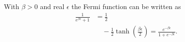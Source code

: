 \documentclass{article}
\begin{document}
With $\beta>0$ and real $\epsilon$ the Fermi function can be written as
\begin{align}
\frac{1}{e^{\beta\epsilon}+1} &= \frac{1}{2} \nonumber\\
&\quad - \frac{1}{2}\tanh\left(\frac{\beta\epsilon}{2}\right) = \frac{e^{-\beta\epsilon}}{1+e^{-\beta\epsilon}} .
\label{eq:nf}
\end{align}
\end{document}
